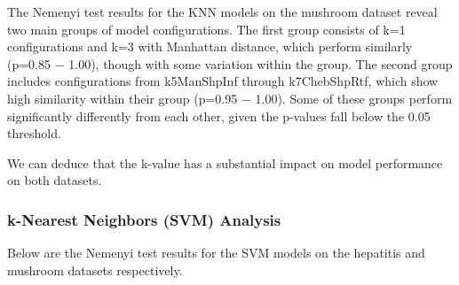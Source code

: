 The Nemenyi test results for the KNN models on the mushroom dataset reveal two main groups of model configurations.
The first group consists of k=1 configurations and k=3 with Manhattan distance, which perform similarly
(p=0.85 $-$ 1.00), though with some variation within the group. The second group includes configurations
from k5ManShpInf through k7ChebShpRtf, which show high similarity within their group (p=0.95 $-$ 1.00).
Some of these groups perform significantly differently from each other, given the p-values fall below the 0.05 threshold.

We can deduce that the k-value has a substantial impact on model performance on both datasets. 

\subsubsection*{k-Nearest Neighbors (SVM) Analysis}
Below are the Nemenyi test results for the SVM models on the hepatitis and mushroom datasets respectively.

